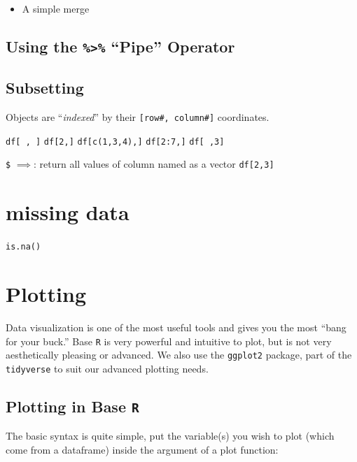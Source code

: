 \documentclass[]{book}
\providecommand{\tightlist}{%
  \setlength{\itemsep}{0pt}\setlength{\parskip}{0pt}}
\theoremstyle{definition}
\theoremstyle{definition}
\theoremstyle{definition}
\theoremstyle{remark}
\begin{document}
\begin{itemize}
\tightlist
\item
  A simple merge
\end{itemize}

\section{\texorpdfstring{Using the \texttt{\%\textgreater{}\%} ``Pipe''
Operator}{Using the \%\textgreater{}\% Pipe Operator}}\label{using-the-pipe-operator}

\section{Subsetting}\label{subsetting}

Objects are ``\emph{indexed}'' by their \texttt{{[}row\#,\ column\#{]}}
coordinates.

\texttt{df{[}\ ,\ {]}} \texttt{df{[}2,{]}} \texttt{df{[}c(1,3,4),{]}}
\texttt{df{[}2:7,{]}} \texttt{df{[}\ ,3{]}}

\texttt{\$} \(\implies\): return all values of column named as a vector
\texttt{df{[}2,3{]}}

\chapter{missing data}\label{missing-data}

\texttt{is.na()}

\hypertarget{plotting}{\chapter{Plotting}\label{plotting}}

Data visualization is one of the most useful tools and gives you the
most ``bang for your buck.'' Base \texttt{R} is very powerful and
intuitive to plot, but is not very aesthetically pleasing or advanced.
We also use the \texttt{ggplot2} package, part of the \texttt{tidyverse}
to suit our advanced plotting needs.

\section{\texorpdfstring{Plotting in Base
\texttt{R}}{Plotting in Base R}}\label{plotting-in-base-r}

The basic syntax is quite simple, put the variable(s) you wish to plot
(which come from a dataframe) inside the argument of a plot function:
\end{document}
